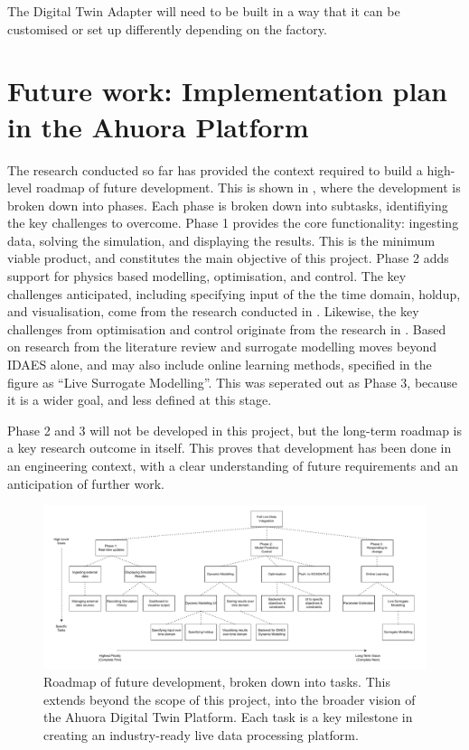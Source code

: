 The Digital Twin Adapter will need to be built in a way that it can be customised or set up differently depending on the factory. 


\section{Future work: Implementation plan in the Ahuora Platform}

The research conducted so far has provided the context required to build a high-level roadmap of future development. This is shown in , where the development is broken down into phases. Each phase is broken down into subtasks, identifiying the key challenges to overcome.
Phase 1 provides the core functionality: ingesting data, solving the simulation, and displaying the results. This is the minimum viable product, and constitutes the main objective of this project. Phase 2 adds support for physics based modelling, optimisation, and control. The key challenges anticipated, including specifying input of the the time domain, holdup, and visualisation, come from the research conducted in . Likewise, the key challenges from optimisation and control originate from the research in . Based on research from the literature review and  surrogate modelling moves beyond IDAES alone, and may also include online learning methods, specified in the figure as ``Live Surrogate Modelling''. This was seperated out as Phase 3, because it is a wider goal, and less defined at this stage. 

Phase 2 and 3 will not be developed in this project, but the long-term roadmap is a key research outcome in itself. This proves that development has been done in an engineering context, with a clear understanding of future requirements and an anticipation of further work.

\begin{landscape}
    \begin{figure}
        \centering
        \includegraphics[width=1.5\textwidth]{roadmap.pdf}
        \caption{Roadmap of future development, broken down into tasks. This extends beyond the scope of this project, into the broader vision of the Ahuora Digital Twin Platform. Each task is a key milestone in creating an industry-ready live data processing platform.}
        \label{fig:development_flowchart}
    \end{figure}
\end{landscape}
